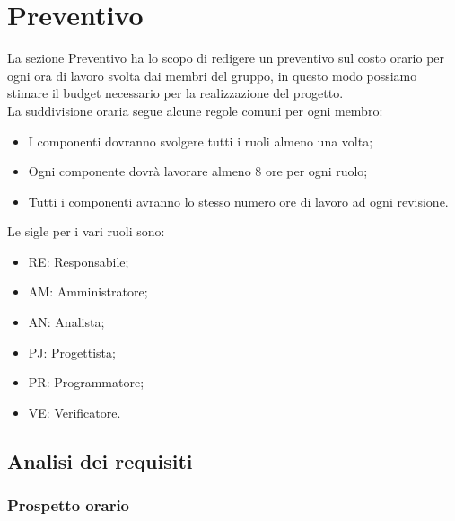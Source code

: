 \section{Preventivo}

La sezione Preventivo ha lo scopo di redigere un preventivo sul costo orario per ogni ora di lavoro svolta dai membri del gruppo, in questo modo possiamo stimare il budget necessario per la realizzazione del progetto.
\\
La suddivisione oraria segue alcune regole comuni per ogni membro:
\begin{itemize}
	\item I componenti dovranno svolgere tutti i ruoli almeno una volta;
	\item Ogni componente dovrà lavorare almeno 8 ore per ogni ruolo;
	\item Tutti i componenti avranno lo stesso numero ore di lavoro ad ogni revisione.
\end{itemize}
Le sigle per i vari ruoli sono:
\begin{itemize}
	\item RE: Responsabile;
	\item AM: Amministratore;
	\item AN: Analista;
	\item PJ: Progettista;
	\item PR: Programmatore;
	\item VE: Verificatore.
\end{itemize}

\newpage
\subsection{Analisi dei requisiti}
\subsubsection{Prospetto orario}